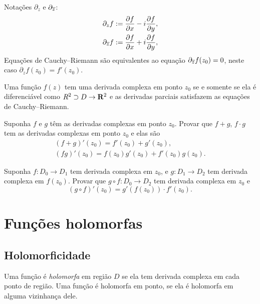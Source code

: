 Notações $\partial_z$ e $\partial_{\overline{z}}$:
\begin{align*}
\partial_z f        &:= \frac{\partial f}{\partial x} - i \frac{\partial f}{\partial y}, \\
\partial_{\overline{z}} f &:= \frac{\partial f}{\partial x} + i \frac{\partial f}{\partial y}, \\
\end{align*}
Equações de Cauchy--Riemann são equivalentes ao equação $\partial_{\overline{z}} f(z_0) = 0$,
neste caso $\partial_z f(z_0) = f'(z_0)$.


\begin{teorema}
Uma função $f(z)$ tem uma derivada complexa em ponto $z_0$ se e somente se
ela é diferenciável como $R^2\supset D \to \mathbf{R}^2$ e as derivadas parciais
satisfazem as equações de Cauchy--Riemann.
\end{teorema}

\begin{problema}
Suponha $f$ e $g$ têm as derivadas complexas em ponto $z_0$.
Provar que $f+g$, $f\cdot g$ tem as derivadas complexas em ponto $z_0$
e elas são
\begin{gather}
(f+g)'(z_0) = f'(z_0)+g'(z_0), \\
(fg)'(z_0) = f(z_0) g'(z_0) + f'(z_0) g(z_0).
\end{gather}
\end{problema}

\begin{problema}
Suponha $f: D_0 \to D_1$ tem derivada complexa em $z_0$,
e $g : D_1 \to D_2$ tem derivada complexa em $f(z_0)$.
Provar que $g\circ f: D_0 \to D_2$ tem derivada complexa em $z_0$
e
\begin{equation}
(g\circ f)'(z_0) = g'(f(z_0)) \cdot f'(z_0).
\end{equation} 
\end{problema}

\section{Funções holomorfas}

\subsection{Holomorficidade}

\begin{defin} Uma função é \emph{holomorfa} em região $D$ se ela tem derivada complexa em cada ponto de região.
Uma função é holomorfa em ponto, se ela é holomorfa em alguma vizinhança dele.
\end{defin}

